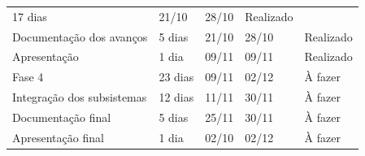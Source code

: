 \begin{table}[H]
{\begin{tabular}{ l l l l l }
    \multicolumn{1}{p{1.700cm}|}{17 dias \centering } &
    \multicolumn{1}{p{1.133cm}|}{21/10 \centering } &
    \multicolumn{1}{p{0.967cm}|}{28/10 \centering } &
    \multicolumn{1}{p{1.833cm}|}{Realizado \centering }
  \\  
  \cline{1-1}\cline{2-2}\cline{3-3}\cline{4-4}\cline{5-5}  
    \multicolumn{1}{|p{3.867cm}|}{Documentação dos avanços} &
    \multicolumn{1}{p{1.700cm}|}{5 dias \centering } &
    \multicolumn{1}{p{1.133cm}|}{21/10 \centering } &
    \multicolumn{1}{p{0.967cm}|}{28/10 \centering } &
    \multicolumn{1}{p{1.833cm}|}{Realizado \centering }
  \\  
  \cline{1-1}\cline{2-2}\cline{3-3}\cline{4-4}\cline{5-5}  
    \multicolumn{1}{|p{3.867cm}|}{Apresentação} &
    \multicolumn{1}{p{1.700cm}|}{1 dia \centering } &
    \multicolumn{1}{p{1.133cm}|}{09/11 \centering } &
    \multicolumn{1}{p{0.967cm}|}{09/11 \centering } &
    \multicolumn{1}{p{1.833cm}|}{Realizado \centering }
  \\  
  \cline{1-1}\cline{2-2}\cline{3-3}\cline{4-4}\cline{5-5}  
    \multicolumn{1}{|p{3.867cm}|}{Fase 4} &
    \multicolumn{1}{p{1.700cm}|}{23 dias \centering } &
    \multicolumn{1}{p{1.133cm}|}{09/11 \centering } &
    \multicolumn{1}{p{0.967cm}|}{02/12 \centering } &
    \multicolumn{1}{p{1.833cm}|}{À fazer \centering }
  \\  
  \cline{1-1}\cline{2-2}\cline{3-3}\cline{4-4}\cline{5-5}  
    \multicolumn{1}{|p{3.867cm}|}{Integração dos subsistemas} &
    \multicolumn{1}{p{1.700cm}|}{12 dias \centering } &
    \multicolumn{1}{p{1.133cm}|}{11/11 \centering } &
    \multicolumn{1}{p{0.967cm}|}{30/11 \centering } &
    \multicolumn{1}{p{1.833cm}|}{À fazer \centering }
  \\  
  \cline{1-1}\cline{2-2}\cline{3-3}\cline{4-4}\cline{5-5}  
    \multicolumn{1}{|p{3.867cm}|}{Documentação final} &
    \multicolumn{1}{p{1.700cm}|}{5 dias \centering } &
    \multicolumn{1}{p{1.133cm}|}{25/11 \centering } &
    \multicolumn{1}{p{0.967cm}|}{30/11 \centering } &
    \multicolumn{1}{p{1.833cm}|}{À fazer \centering }
  \\  
  \cline{1-1}\cline{2-2}\cline{3-3}\cline{4-4}\cline{5-5}  
    \multicolumn{1}{|p{3.867cm}|}{Apresentação final} &
    \multicolumn{1}{p{1.700cm}|}{1 dia \centering } &
    \multicolumn{1}{p{1.133cm}|}{02/10 \centering } &
    \multicolumn{1}{p{0.967cm}|}{02/12 \centering } &
    \multicolumn{1}{p{1.833cm}|}{À fazer \centering }
  \\  
  \hline

 \end{tabular} }
\end{table}

